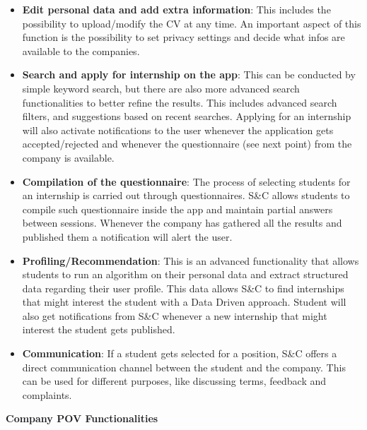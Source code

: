 \begin{itemize}
      \item \textbf{Edit personal data and add extra information}: This includes the possibility to upload/modify the
            CV at any time. An important aspect of this function is the possibility to set privacy settings and decide
            what infos are available to the companies.
      \item \textbf{Search and apply for internship on the app}: This can be conducted by simple keyword search, but
            there are also more advanced search functionalities to better refine the results. This includes advanced
            search filters, and suggestions based on recent searches. Applying for an internship will also activate
            notifications to the user whenever the application gets accepted/rejected and whenever the questionnaire
            (see next point) from the company is available.
      \item \textbf{Compilation of the questionnaire}: The process of selecting students for an internship is carried
            out through questionnaires. S\&C allows students to compile such questionnaire inside the app and maintain
            partial answers between sessions. Whenever the company has gathered all the results and published them a
            notification will alert the user.
      \item \textbf{Profiling/Recommendation}: This is an advanced functionality that allows students to run an
            algorithm on their personal data and extract structured data regarding their user profile. This data allows
            S\&C to find internships that might interest the student with a Data Driven approach. Student will also get
            notifications from S\&C whenever a new internship that might interest the student gets published.
      \item \textbf{Communication}: If a student gets selected for a position, S\&C offers a direct communication
            channel between the student and the company. This can be used for different purposes, like discussing
            terms, feedback and complaints.
\end{itemize}

\par\textbf{Company POV Functionalities}

